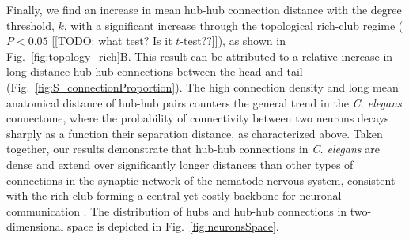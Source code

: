 \documentclass[10pt,letterpaper]{article}
\begin{document}
Finally, we find an increase in mean hub-hub connection distance with the degree threshold, $k$, with a significant increase through the topological rich-club regime ($P < 0.05$ [[TODO: what test? Is it $t$-test??]]), as shown in Fig.~\ref{fig:topology_rich}B.
This result can be attributed to a relative increase in long-distance hub-hub connections between the head and tail (Fig.~\ref{fig:S_connectionProportion}).
The high connection density and long mean anatomical distance of hub-hub pairs counters the general trend in the \emph{C. elegans} connectome, where the probability of connectivity between two neurons decays sharply as a function their separation distance, as characterized above.
Taken together, our results demonstrate that hub-hub connections in \emph{C. elegans} are dense and extend over significantly longer distances than other types of connections in the synaptic network of the nematode nervous system, consistent with the rich club forming a central yet costly backbone for neuronal communication \cite{vandenHeuvel:2012kh}.
The distribution of hubs and hub-hub connections in two-dimensional space is depicted in Fig.~\ref{fig:neuronsSpace}.




\end{document}
